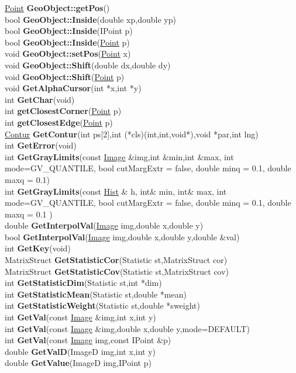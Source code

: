 \documentclass[10pt,titlepage]{article}
\def\functionlistentry#1#2#3#4#5#6{\noindent #1 {\bf #2}(#3) \dotfill #6\\}
\begin{document}
{{\functionlistentry{\hyperlink{Point}{Point}}{GeoObject::getPos}{}{503}{geoObject}{}
\functionlistentry{bool}{GeoObject::Inside}{double xp,double yp}{511}{geoObject}{}
\functionlistentry{bool}{GeoObject::Inside}{IPoint p}{512}{geoObject}{}
\functionlistentry{bool}{GeoObject::Inside}{\hyperlink{Point}{Point} p}{513}{geoObject}{}
\functionlistentry{void}{GeoObject::setPos}{\hyperlink{Point}{Point} x}{504}{geoObject}{}
\functionlistentry{void}{GeoObject::Shift}{double dx,double dy}{505}{geoObject}{}
\functionlistentry{void}{GeoObject::Shift}{\hyperlink{Point}{Point} p}{506}{geoObject}{}
\functionlistentry{void}{GetAlphaCursor}{int *x,int *y}{1423}{genericTools}{}
\functionlistentry{int}{GetChar}{void}{1429}{genericTools}{}
\functionlistentry{int}{getClosestCorner}{\hyperlink{Point}{Point} p}{605}{geoObject}{}
\functionlistentry{int}{getClosestEdge}{\hyperlink{Point}{Point} p}{606}{geoObject}{}
\functionlistentry{\hyperlink{Contur}{Contur}}{GetContur}{int ps[2],int (*cls)(int,int,void*),void *par,int lng}{442}{conturs}{}
\functionlistentry{int}{GetError}{void}{1550}{errorHandling}{}
\functionlistentry{int}{GetGrayLimits}{const \hyperlink{Image}{Image} \&img,int \&min,int \&max, int mode=GV\_QUANTILE, bool cutMargExtr = false, double minq = 0.1, double maxq = 0.1}{1072}{processing}{}
\functionlistentry{int}{GetGrayLimits}{const \hyperlink{Hist}{Hist} \& h, int\& min, int\& max, int mode=GV\_QUANTILE, bool cutMargExtr = false, double minq = 0.1, double maxq = 0.1 }{1073}{processing}{}
\functionlistentry{double}{GetInterpolVal}{\hyperlink{Image}{Image} img,double x,double y}{69}{Images}{}
\functionlistentry{bool}{GetInterpolVal}{\hyperlink{Image}{Image} img,double x,double y,double \&val}{70}{Images}{}
\functionlistentry{int}{GetKey}{void}{1430}{genericTools}{}
\functionlistentry{MatrixStruct}{GetStatisticCor}{Statistic st,MatrixStruct cor}{1600}{obsolet}{}
\functionlistentry{MatrixStruct}{GetStatisticCov}{Statistic st,MatrixStruct cov}{1599}{obsolet}{}
\functionlistentry{int}{GetStatisticDim}{Statistic st,int *dim}{1596}{obsolet}{}
\functionlistentry{int}{GetStatisticMean}{Statistic st,double *mean}{1598}{obsolet}{}
\functionlistentry{int}{GetStatisticWeight}{Statistic st,double *sweight}{1597}{obsolet}{}
\functionlistentry{int}{GetVal}{const \hyperlink{Image}{Image} \&img,int x,int y}{65}{Images}{}
\functionlistentry{int}{GetVal}{const \hyperlink{Image}{Image} \&img,double x,double y,mode=DEFAULT}{66}{Images}{}
\functionlistentry{int}{GetVal}{const \hyperlink{Image}{Image} img,const IPoint \&p}{68}{Images}{}
\functionlistentry{double}{GetValD}{ImageD img,int x,int y}{81}{Images}{}
\functionlistentry{double}{GetValue}{ImageD img,IPoint p}{83}{Images}{}

}}
\end{document}
